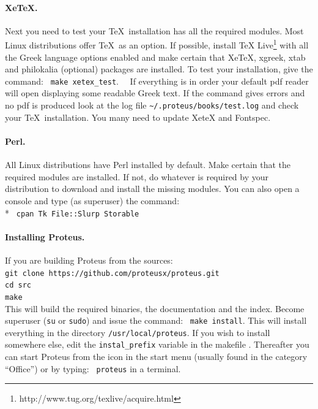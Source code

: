\documentclass[11pt,a4paper]{article}
\begin{document}
    \paragraph{XeTeX.}
      Next you need to test your \TeX\ installation has all the required modules.
      Most Linux distributions offer \TeX\ as an option. If possible, install
      TeX Live\footnote{http://www.tug.org/texlive/acquire.html} with all the
      Greek language options enabled and make certain that XeTeX, xgreek, xtab
      and philokalia (optional) packages are installed.
      To test your installation, give the command:~ {\tt make xetex\_test}.~~
      If everything is in order your default pdf reader will open displaying
      some readable Greek text.  If the command gives errors and no pdf is produced
      look at the log file {\tt \~{}/.proteus/books/test.log}  and check your
      \TeX\ installation. You many need to update XeteX and Fontspec.
    \paragraph{Perl.}
      All Linux distributions have Perl installed by default.  Make certain that
      the required modules are installed. If not, do whatever is required
      by your distribution to download and install the missing modules.
      You can also open a console and type (as superuser) the
      command:\\*  {\tt \hspace*{2cm} cpan Tk File::Slurp Storable}
      \paragraph{Installing Proteus.}
      If you are building Proteus from the sources:\\
      {\tt\hspace*{1cm}git clone https://github.com/proteusx/proteus.git\\
         \hspace*{1cm}cd src\\
         \hspace*{1cm}make}\\
         This will build the required binaries, the documentation and the index.
      Become superuser ({\tt su} or {\tt sudo}) and issue the command:~
      {\tt make install}.\newline
      This will install everything in the directory {\tt /usr/local/proteus}.
      If you wish to install somewhere else, edit the {\tt instal\_prefix}
      variable in the makefile .
      Thereafter you can start Proteus from the icon in the start menu
      (usually found in the category ``Office'') or by typing:~ {\tt proteus}
      in a terminal.
\end{document}
